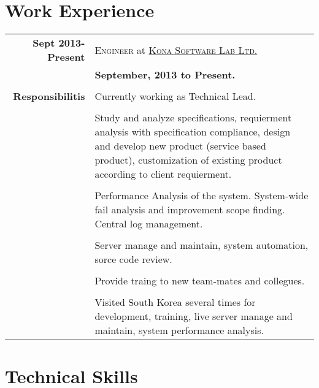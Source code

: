 \documentclass[a4paper,10pt]{article}
\newcommand{\kslwithlink}{\textsc{\href{www.konasl.com}{Kona Software Lab Ltd.}}}
\begin{document}
\section*{Work Experience}
\begin{tabular}{r|p{12.5cm}}					  
\textbf{Sept 2013-Present}		&\textsc{Engineer} at \kslwithlink\\
							&\textbf{September, 2013 to Present.}\\\\
							
\textbf{Responsibilitis}	&Currently working as Technical Lead.\\\\
							&Study and analyze specifications, requierment analysis with specification compliance, design and develop new product (service based product), customization of existing product according to client requierment.\\\\
							&Performance Analysis of the system. System-wide fail analysis and improvement scope finding. Central log management.\\\\
							&Server manage and maintain, system automation, sorce code review.\\\\
							&Provide traing to new team-mates and collegues.\\\\
							&Visited South Korea several times for development, training, live server manage and maintain, system performance analysis.\\						
\end{tabular}
\section*{Technical Skills}
\end{document}
